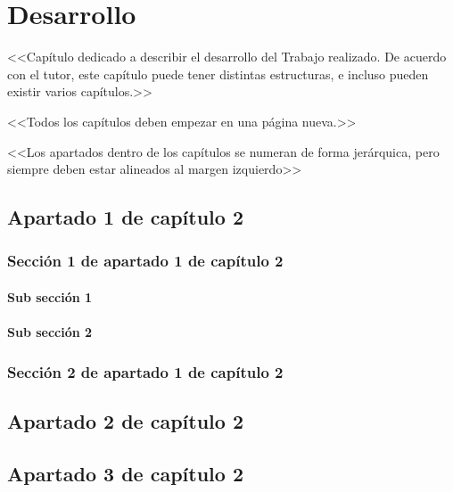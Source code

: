 \chapter{Desarrollo} \label{chp:desarrollo}

<<Capítulo dedicado a describir el desarrollo del Trabajo realizado. De acuerdo con el tutor, este capítulo puede tener distintas estructuras, e incluso pueden existir varios capítulos.>>

<<Todos los capítulos deben empezar en una página nueva.>>

<<Los apartados dentro de los capítulos se numeran de forma jerárquica, pero siempre deben estar alineados al margen izquierdo>>

\section{Apartado 1 de capítulo 2}

\subsection{Sección 1 de apartado 1 de capítulo 2}

\subsubsection{Sub sección 1}

\subsubsection{Sub sección 2}

\subsection{Sección 2 de apartado 1 de capítulo 2}

\section{Apartado 2 de capítulo 2}

\section{Apartado 3 de capítulo 2}
